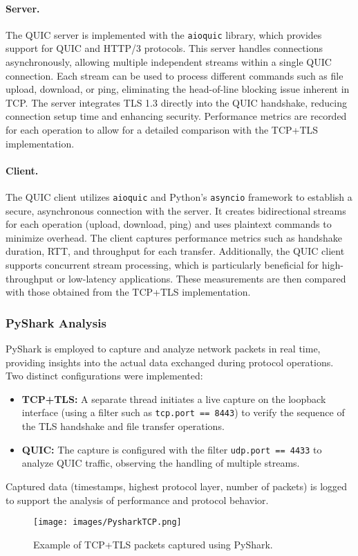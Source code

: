 \paragraph{Server.} The QUIC server is implemented with the \texttt{aioquic} library, which provides support for QUIC and HTTP/3 protocols. This server handles connections asynchronously, allowing multiple independent streams within a single QUIC connection. Each stream can be used to process different commands such as file upload, download, or ping, eliminating the head-of-line blocking issue inherent in TCP. The server integrates TLS 1.3 directly into the QUIC handshake, reducing connection setup time and enhancing security. Performance metrics are recorded for each operation to allow for a detailed comparison with the TCP+TLS implementation.

\paragraph{Client.} The QUIC client utilizes \texttt{aioquic} and Python's \texttt{asyncio} framework to establish a secure, asynchronous connection with the server. It creates bidirectional streams for each operation (upload, download, ping) and uses plaintext commands to minimize overhead. The client captures performance metrics such as handshake duration, RTT, and throughput for each transfer. Additionally, the QUIC client supports concurrent stream processing, which is particularly beneficial for high-throughput or low-latency applications. These measurements are then compared with those obtained from the TCP+TLS implementation.

\subsubsection{PyShark Analysis}
PyShark is employed to capture and analyze network packets in real time, providing insights into the actual data exchanged during protocol operations. Two distinct configurations were implemented:

\begin{itemize}
\item \textbf{TCP+TLS:} A separate thread initiates a live capture on the loopback interface (using a filter such as \texttt{tcp.port == 8443}) to verify the sequence of the TLS handshake and file transfer operations.

\item \textbf{QUIC:} The capture is configured with the filter \texttt{udp.port == 4433} to analyze QUIC traffic, observing the handling of multiple streams.
\end{itemize}

Captured data (timestamps, highest protocol layer, number of packets) is logged to support the analysis of performance and protocol behavior.

\begin{figure}[h]
	\centering
	\texttt{[image: images/PysharkTCP.png]}
	\caption{Example of TCP+TLS packets captured using PyShark.}
\end{figure}